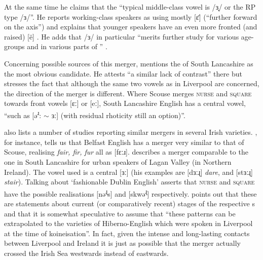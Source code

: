 At the same time he claims that the ``typical middle-class vowel is /ɜ̟/ or the RP type /ɜ/''. He reports working-class speakers as using mostly [ɛ̈] (``further forward on the axis'') and explains that younger speakers have an even more fronted (and raised) [ë] \citep[271]{knowles1973}.
He adds that /ɜ/ in particular ``merits further study for various age-groups and in various parts of '' \citeyearpar[320]{knowles1973}.

Concerning possible sources of this merger, \citet[128]{honeybone2007} mentions the  of South Lancashire as the most obvious candidate.
He attests ``a similar lack of contrast'' there but stresses the fact that although the same two vowels as in Liverpool are concerned, the direction of the merger is different.
Where Scouse merges \textsc{nurse} and \textsc{square} towards front vowels [ɛː] or [eː], South Lancashire English has a central vowel, ``such as [ə\textsuperscript{ɹ}: \(\sim\) ɜː] (with residual rhoticity still an option)''.

\parencite{honeybone2007} also lists a number of studies reporting similar mergers in several Irish varieties.
\citet{wells1982}, for instance, tells us that Belfast English has a merger very similar to that of Scouse, realising \emph{fair, fir, fur} all as [fɛːɹ].
\citet[cf.][48]{harris1985} describes a merger comparable to the one in South Lancashire for urban speakers of Lagan Valley (in Northern Ireland).
The vowel used is a central [ɜː] (his examples are [dɜːɻ] \emph{dare}, and [stɜːɻ] \emph{stair}).
Talking about `fashionable Dublin English' \citet{hickey1999} asserts that \textsc{nurse} and \textsc{square} have the possible realisations [nə\textsuperscript{ɻ}s] and [skwə\textsuperscript{ɻ}] respectively.
\parencite[128]{honeybone2007} points out that these are statements about current (or comparatively recent) stages of the respective s and that it is somewhat speculative to assume that ``these patterns can be extrapolated to the varieties of Hiberno-English which were spoken in Liverpool at the time of koineisation''.
In fact, given the intense and long-lasting contacts between Liverpool and Ireland it is just as possible that the merger actually crossed the Irish Sea westwards instead of eastwards.

